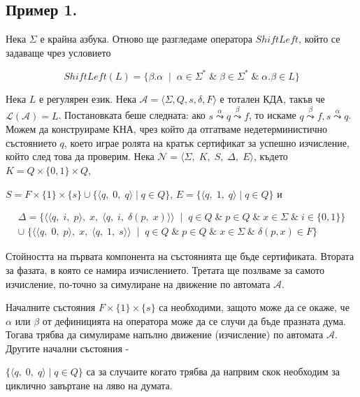 \documentclass[12pt]{article}
\begin{document}
\subsection*{Пример 1.}
Нека \(\Sigma\) е крайна азбука. Отново ще разгледаме оператора \(ShiftLeft\), който се задаваще чрез условието

\[ShiftLeft(L) = \{\beta.\alpha \;\mid\; \alpha \in \Sigma^* \;\&\; \beta \in \Sigma^* \;\&\; \alpha.\beta \in L\}\]

Нека \(L\) е регулярен език. Нека \(\mathcal{A} = \langle \Sigma, Q, s, \delta, F \rangle\) е тотален КДА, такъв че \(\mathcal{L}(\mathcal{A}) = L\).
Постановката беше следната: ако \(s \overset{\alpha}{\leadsto} q \overset{\beta}{\leadsto} f\), то искаме \(q \overset{\beta}{\leadsto} f, s \overset{\alpha}{\leadsto} q \). Можем да конструираме КНА, чрез който да отгатваме недетерминистично състоянието \(q\), което играе ролята на кратък сертификат за успешно изчисление, който след това да проверим. Нека  \(\mathcal{N} = \langle \Sigma,\; K,\; S,\; \Delta,\; E \rangle\), където
\(K = Q \times \{0, 1\} \times Q\),

\(S = F \times \{1\} \times \{s\} \cup \{\langle q,\; 0,\; q \rangle \mid q \in Q\}\),
\(E = \{\langle q,\; 1,\; q \rangle \mid q \in Q\}\) и

\begin{align*}
    \Delta = \{ \langle \langle q,\; i,\;p \rangle,\; x,\; \langle q,\; i,\; \delta(p,\; x) \rangle \rangle \;\mid\; q \in Q \;\&\; p \in Q \;\&\; x \in \Sigma \;\&\; i \in \{0, 1\} \} \\
    \cup \; \{ \langle \langle q,\; 0,\; p \rangle,\; x,\; \langle q,\; 1,\; s \rangle \rangle \;\mid\; q \in Q \;\&\; p \in Q \;\&\; x \in \Sigma \;\&\; \delta(p, x) \in F\} 
\end{align*}

Стойността на първата компонента на състоянията ще бъде сертификата. Втората за фазата, в която  се намира изчислението.
Третата ще позлваме за самото изчисление, по-точно за симулиране на движение по автомата \(\mathcal A\).

Началните състояния  \( F \times \{1\} \times \{s\}\) са необходими, защото може да се окаже, че \(\alpha\) или \(\beta\) от дефиницията на оператора може да се случи да бъде празната дума. Тогава трябва да симулираме напълно движение (изчисление) по автомата \(\mathcal A\). Другите начални състояния -

\(\{\langle q,\; 0,\; q \rangle \mid q \in Q\}\) са за случаите когато трябва да напрвим скок необходим за циклично завъртане на ляво на думата. 
\end{document}
